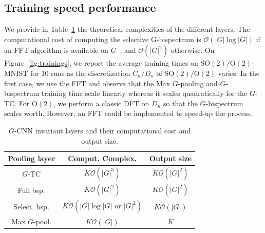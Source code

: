 \documentclass{article}
\theoremstyle{plain}
\theoremstyle{definition}
\theoremstyle{remark}
\begin{document}
\subsection{Training speed performance}
We provide in Table~\ref{tab:complexities} the theoretical complexities of the different layers. The computational cost of computing the selective G-bispectrum is $\mathcal{O}(|G|\log |G|)$ if an FFT algorithm is available on $G$~\cite{Diaconis1990EfficientCO}, and $\mathcal{O}(|G|^2)$ otherwise. On Figure~\ref{fig:trainings}, we report the average training times on $\mathrm{SO}(2)/\mathrm{O}(2)$-MNIST for 10 runs as the discretization $C_n/D_n$ of $\mathrm{SO}(2)/\mathrm{O}(2)$ varies. In the first case, we use the FFT and observe that the Max $G$-pooling and $G$-bispectrum training time scale linearly whereas it scales quadratically for the $G$-TC. For $\mathrm{O}(2)$, we perform a classic DFT on $D_n$ so that the $G$-bispectrum scales worth. However, an FFT could be implemented to speed-up the process.
\begin{table}[h]
    \centering
    \begin{tabular}{||c||c|c||}
        \hline
         Pooling layer&  Comput. Complex.& Output size\\
         \hline
         $G$-TC& $K\mathcal{O}(|G|^3)$&$K\mathcal{O}(|G|^2)$\\
         \hline
         Full bsp.& $K\mathcal{O}(|G|^2)$&$K\mathcal{O}(|G|^2)$\\
         \hline
         Select. bsp.& $K\mathcal{O}(|G|\log|G|\text{ or }|G|^2)$&$K\mathcal{O}(|G|)$\\
         \hline
         Max $G$-pool.&$K\mathcal{O}(|G|)$&$K$\\
         \hline
    \end{tabular}
    \caption{$G$-CNN invariant layers and their computational cost and output size. \vspace{-0.5cm}}
    \label{tab:complexities}
\end{table}
\end{document}

